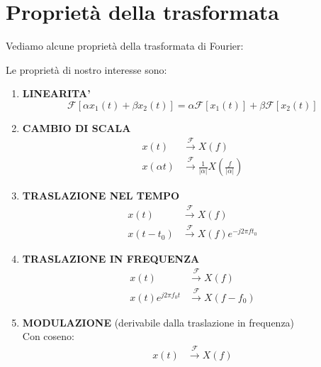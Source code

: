\section{Proprietà della trasformata}

Vediamo alcune proprietà della trasformata di Fourier:

\begin{prop}
    Le proprietà di nostro interesse sono:
    \begin{enumerate}
        \item \textbf{LINEARITA'} 
            \[
                \mathcal{F}[\alpha x_{1}(t) + \beta x_{2}(t)]=
                \alpha \mathcal{F}[x_{1}(t)] + \beta \mathcal{F}[x_{2}(t)]
            \]
        \item \textbf{CAMBIO DI SCALA}
            \[
                \begin{aligned}
                    x(t) &\overset{\mathcal{F}}{ \longrightarrow } X(f) \\ 
                    x(\alpha t) &\overset{\mathcal{F}}{ \longrightarrow } 
                    \frac{1}{|\alpha |}X \left( \frac{f}{|\alpha |} \right)
                \end{aligned}
            \]
        \item \textbf{TRASLAZIONE NEL TEMPO}
            \[
                \begin{aligned}
                    x(t) &\overset{\mathcal{F}}{ \longrightarrow } X(f) \\ 
                    x(t-t_{0}) &\overset{\mathcal{F}}{ \longrightarrow } X(f)e^{-j 2\pi ft_{0}}
                \end{aligned}
            \]
        \item \textbf{TRASLAZIONE IN FREQUENZA}
            \[
                \begin{aligned}
                    x(t) &\overset{\mathcal{F}}{ \longrightarrow } X(f) \\ 
                    x(t)e^{j 2\pi f_{0}t} &\overset{\mathcal{F}}{ \longrightarrow } X(f-f_{0})
                \end{aligned}
            \] 
        \item \textbf{MODULAZIONE} (derivabile dalla traslazione in frequenza) \\
            Con coseno:
            \[
                \begin{aligned}
                    x(t) &\overset{\mathcal{F}}{ \longrightarrow } X(f) \\ 

\end{aligned}\]
\end{enumerate}
\end{prop}
